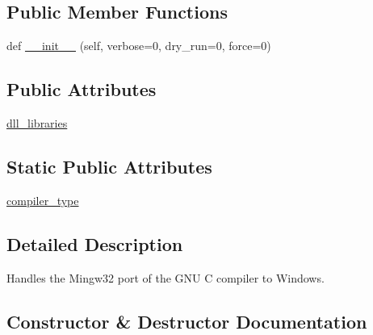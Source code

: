 \subsection*{Public Member Functions}
\begin{DoxyCompactItemize}
\item 
def \hyperlink{classsetuptools_1_1__distutils_1_1cygwinccompiler_1_1Mingw32CCompiler_aa9b74c3fa3e7e9d2c6ab65492269712e}{\+\_\+\+\_\+init\+\_\+\+\_\+} (self, verbose=0, dry\+\_\+run=0, force=0)
\end{DoxyCompactItemize}
\subsection*{Public Attributes}
\begin{DoxyCompactItemize}
\item 
\hyperlink{classsetuptools_1_1__distutils_1_1cygwinccompiler_1_1Mingw32CCompiler_a1341f1cbf5f5a251fe3ca833c9a4d1ed}{dll\+\_\+libraries}
\end{DoxyCompactItemize}
\subsection*{Static Public Attributes}
\begin{DoxyCompactItemize}
\item 
\hyperlink{classsetuptools_1_1__distutils_1_1cygwinccompiler_1_1Mingw32CCompiler_a81dcfb35f4d3fddf84360a4a088863b0}{compiler\+\_\+type}
\end{DoxyCompactItemize}


\subsection{Detailed Description}
\begin{DoxyVerb}Handles the Mingw32 port of the GNU C compiler to Windows.
\end{DoxyVerb}
 

\subsection{Constructor \& Destructor Documentation}
\mbox{\label{classsetuptools_1_1__distutils_1_1cygwinccompiler_1_1Mingw32CCompiler_aa9b74c3fa3e7e9d2c6ab65492269712e}} 
